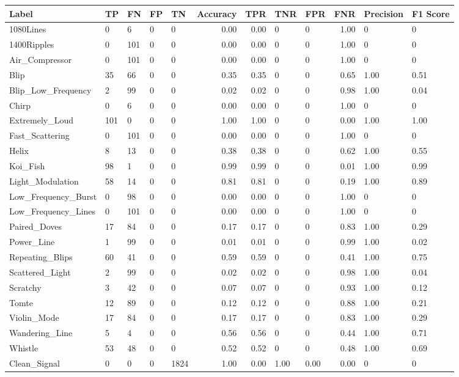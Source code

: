 \begin{tabular}{lllllrrllrll}
\toprule
Label & TP & FN & FP & TN & Accuracy & TPR & TNR & FPR & FNR & Precision & F1 Score \\
\midrule
1080Lines & 0 & 6 & 0 & 0 & 0.00 & 0.00 & 0 & 0 & 1.00 & 0 & 0 \\
1400Ripples & 0 & 101 & 0 & 0 & 0.00 & 0.00 & 0 & 0 & 1.00 & 0 & 0 \\
Air\_Compressor & 0 & 101 & 0 & 0 & 0.00 & 0.00 & 0 & 0 & 1.00 & 0 & 0 \\
Blip & 35 & 66 & 0 & 0 & 0.35 & 0.35 & 0 & 0 & 0.65 & 1.00 & 0.51 \\
Blip\_Low\_Frequency & 2 & 99 & 0 & 0 & 0.02 & 0.02 & 0 & 0 & 0.98 & 1.00 & 0.04 \\
Chirp & 0 & 6 & 0 & 0 & 0.00 & 0.00 & 0 & 0 & 1.00 & 0 & 0 \\
Extremely\_Loud & 101 & 0 & 0 & 0 & 1.00 & 1.00 & 0 & 0 & 0.00 & 1.00 & 1.00 \\
Fast\_Scattering & 0 & 101 & 0 & 0 & 0.00 & 0.00 & 0 & 0 & 1.00 & 0 & 0 \\
Helix & 8 & 13 & 0 & 0 & 0.38 & 0.38 & 0 & 0 & 0.62 & 1.00 & 0.55 \\
Koi\_Fish & 98 & 1 & 0 & 0 & 0.99 & 0.99 & 0 & 0 & 0.01 & 1.00 & 0.99 \\
Light\_Modulation & 58 & 14 & 0 & 0 & 0.81 & 0.81 & 0 & 0 & 0.19 & 1.00 & 0.89 \\
Low\_Frequency\_Burst & 0 & 98 & 0 & 0 & 0.00 & 0.00 & 0 & 0 & 1.00 & 0 & 0 \\
Low\_Frequency\_Lines & 0 & 101 & 0 & 0 & 0.00 & 0.00 & 0 & 0 & 1.00 & 0 & 0 \\
Paired\_Doves & 17 & 84 & 0 & 0 & 0.17 & 0.17 & 0 & 0 & 0.83 & 1.00 & 0.29 \\
Power\_Line & 1 & 99 & 0 & 0 & 0.01 & 0.01 & 0 & 0 & 0.99 & 1.00 & 0.02 \\
Repeating\_Blips & 60 & 41 & 0 & 0 & 0.59 & 0.59 & 0 & 0 & 0.41 & 1.00 & 0.75 \\
Scattered\_Light & 2 & 99 & 0 & 0 & 0.02 & 0.02 & 0 & 0 & 0.98 & 1.00 & 0.04 \\
Scratchy & 3 & 42 & 0 & 0 & 0.07 & 0.07 & 0 & 0 & 0.93 & 1.00 & 0.12 \\
Tomte & 12 & 89 & 0 & 0 & 0.12 & 0.12 & 0 & 0 & 0.88 & 1.00 & 0.21 \\
Violin\_Mode & 17 & 84 & 0 & 0 & 0.17 & 0.17 & 0 & 0 & 0.83 & 1.00 & 0.29 \\
Wandering\_Line & 5 & 4 & 0 & 0 & 0.56 & 0.56 & 0 & 0 & 0.44 & 1.00 & 0.71 \\
Whistle & 53 & 48 & 0 & 0 & 0.52 & 0.52 & 0 & 0 & 0.48 & 1.00 & 0.69 \\
Clean\_Signal & 0 & 0 & 0 & 1824 & 1.00 & 0.00 & 1.00 & 0.00 & 0.00 & 0 & 0 \\
\bottomrule
\end{tabular}
